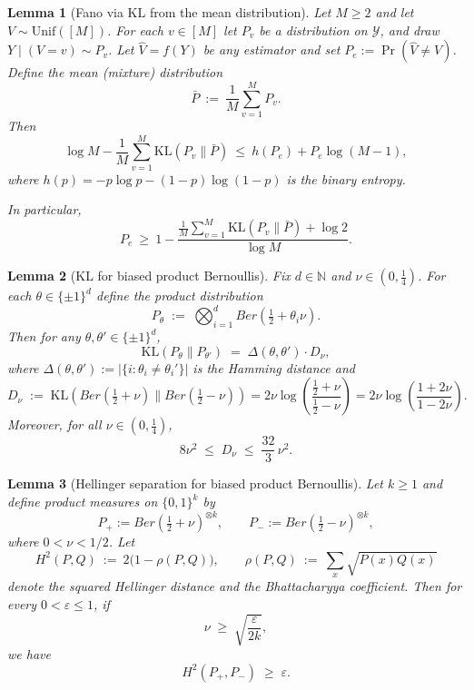 \documentclass[10pt,a4paper]{amsart}
\newtheorem{lemma}{Lemma}
\newcommand{\Ber}{Ber}
\newcommand{\KL}{\mathrm{KL}}
\newcommand{\Unif}{\mathrm{Unif}}
\newcommand{\Y}{\mathcal{Y}}
\newcommand{\eps}{\varepsilon}
\begin{document}
\begin{lemma}[Fano via KL from the mean distribution]
\label{lem:fano-kl-mean}
Let $M\ge 2$ and let $V\sim\Unif([M])$.
For each $v\in[M]$ let $P_v$ be a distribution on $\Y$, and draw
$Y\mid(V=v)\sim P_v$.
Let $\widehat V=f(Y)$ be any estimator and set $P_e:=\Pr(\widehat V\neq V)$.
Define the mean (mixture) distribution
\[
\bar P \ :=\ \frac1M\sum_{v=1}^M P_v.
\]
Then
\begin{equation}
\log M - \frac1M\sum_{v=1}^M \KL(P_v\|\bar P)
\ \le\ h(P_e)+P_e\log(M-1),
\label{eq:fano-kl-mean-tight}
\end{equation}
where $h(p)=-p\log p-(1-p)\log(1-p)$ is the binary entropy.

In particular,
\begin{equation}
P_e
\ \ge\
1-\frac{\frac1M\sum_{v=1}^M \KL(P_v\|\bar P)+\log 2}{\log M}.
\label{eq:fano-kl-mean-simplified}
\end{equation}
\end{lemma}

\begin{lemma}[KL for biased product Bernoullis]
\label{lem:kl-product-bernoulli}
Fix $d\in\mathbb N$ and $\nu\in(0,\tfrac14)$.
For each $\theta\in\{\pm1\}^d$ define the product distribution
\[
P_\theta \;:=\; \bigotimes_{i=1}^d \Ber\!\left(\tfrac12+\theta_i\nu\right).
\]
Then for any $\theta,\theta'\in\{\pm1\}^d$,
\[
\KL(P_\theta\|P_{\theta'})
\;=\;
\Delta(\theta,\theta')\cdot D_\nu,
\]
where $\Delta(\theta,\theta'):=|\{i:\theta_i\neq\theta_i'\}|$ is the Hamming distance and
\[
D_\nu
\;:=\;
\KL\!\left(\Ber\!\left(\tfrac12+\nu\right)\Big\|\Ber\!\left(\tfrac12-\nu\right)\right)
=
2\nu\log\!\left(\frac{\tfrac12+\nu}{\tfrac12-\nu}\right)
=
2\nu\log\!\left(\frac{1+2\nu}{1-2\nu}\right).
\]
Moreover, for all $\nu\in(0,\tfrac14)$,
\[
8\nu^2 \;\le\; D_\nu \;\le\; \frac{32}{3}\,\nu^2.
\]
\end{lemma}

\begin{lemma}[Hellinger separation for biased product Bernoullis]
\label{lem:hellinger-product-bernoulli}
Let $k\ge 1$ and define product measures on $\{0,1\}^k$ by
\[
P_+ := \Ber\!\left(\tfrac12+\nu\right)^{\otimes k},
\qquad
P_- := \Ber\!\left(\tfrac12-\nu\right)^{\otimes k},
\]
where $0<\nu<1/2$. Let
\[
H^2(P,Q)\ :=\ 2\bigl(1-\rho(P,Q)\bigr),
\qquad
\rho(P,Q)\ :=\ \sum_{x}\sqrt{P(x)Q(x)}
\]
denote the squared Hellinger distance and the Bhattacharyya coefficient.
Then for every $0<\eps\le 1$, if
\[
\nu \;\ge\; \sqrt{\frac{\eps}{2k}},
\]
we have
\[
H^2(P_+,P_-) \;\ge\; \eps .
\]
\end{lemma}
\end{document}
